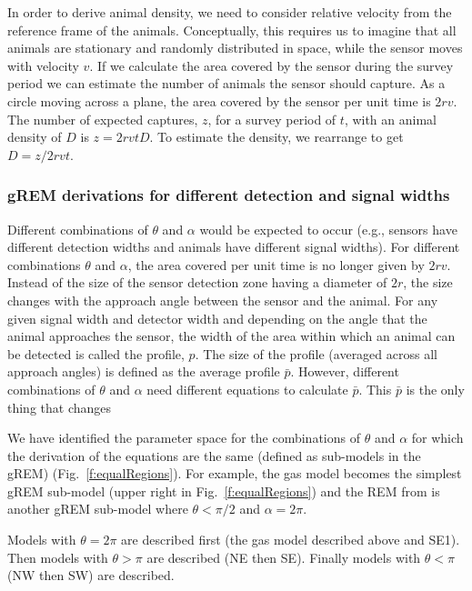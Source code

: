 \begin{figure}[t]
\label{f:xis}
\end{figure}



In order to derive animal density, we need to consider relative velocity from the reference frame of the animals. Conceptually, this requires us to imagine that all animals are stationary and randomly distributed in space, while the sensor moves with velocity $v$. If we calculate the area covered by the sensor during the survey period we can estimate the number of animals the sensor should capture. As a circle moving across a plane, the area covered by the sensor per unit time is $2rv$. The number of expected captures, $z$, for a survey period of $t$, with an animal density of $D$ is $z = 2rvtD$. To estimate the density, we rearrange to get $D = z/2rvt$.

\subsubsection{gREM derivations for different detection and signal widths}
Different combinations of $\theta$ and $\alpha$ would be expected to occur (e.g., sensors have different detection widths and animals have different signal widths). For different combinations $\theta$ and $\alpha$, the area covered per unit time is no longer given by $2rv$. Instead of the size of the sensor detection zone having a diameter of $2r$, the size changes with the approach angle between the sensor and the animal. For any given signal width and detector width and depending on the angle that the animal approaches the sensor, the width of the area within which an animal can be detected is called the profile, $p$. The size of the profile (averaged across all approach angles) is defined as the average profile $\bar{p}$. However, different combinations of $\theta$ and $\alpha$ need different equations to calculate $\bar{p}$. This $\bar{p}$ is the only thing that changes 

We have identified the parameter space for the combinations of $\theta$ and $\alpha$ for which the derivation of the equations are the same (defined as sub-models in the gREM) (Fig.~\ref{f:equalRegions}). For example, the gas model becomes the simplest gREM sub-model (upper right in Fig.~\ref{f:equalRegions}) and the REM from \cite{rowcliffe2008estimating} is another gREM sub-model where $\theta<\pi/2$ and $\alpha = 2\pi$.

Models with $\theta = 2\pi$ are described first (the gas model described above and SE1). Then models with $\theta > \pi$ are described (NE then SE). Finally models with $\theta < \pi$ (NW then SW) are described. 

